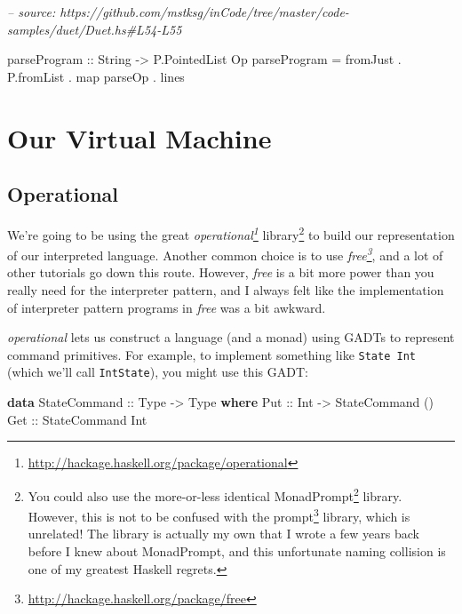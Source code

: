 \documentclass[]{article}
\newenvironment{Shaded}{}{}
\newcommand{\CommentTok}[1]{\textcolor[rgb]{0.38,0.63,0.69}{\textit{#1}}}
\newcommand{\DataTypeTok}[1]{\textcolor[rgb]{0.56,0.13,0.00}{#1}}
\newcommand{\FunctionTok}[1]{\textcolor[rgb]{0.02,0.16,0.49}{#1}}
\newcommand{\KeywordTok}[1]{\textcolor[rgb]{0.00,0.44,0.13}{\textbf{#1}}}
\newcommand{\NormalTok}[1]{#1}
\newcommand{\OtherTok}[1]{\textcolor[rgb]{0.00,0.44,0.13}{#1}}
\renewcommand{\href}[2]{#2\footnote{\url{#1}}}
\begin{document}
\begin{Shaded}
\begin{Highlighting}[]
\CommentTok{-- source: https://github.com/mstksg/inCode/tree/master/code-samples/duet/Duet.hs#L54-L55}

\OtherTok{parseProgram ::} \DataTypeTok{String} \OtherTok{->} \DataTypeTok{P.PointedList} \DataTypeTok{Op}
\NormalTok{parseProgram }\FunctionTok{=}\NormalTok{ fromJust }\FunctionTok{.}\NormalTok{ P.fromList }\FunctionTok{.}\NormalTok{ map parseOp }\FunctionTok{.}\NormalTok{ lines}
\end{Highlighting}
\end{Shaded}

\hypertarget{our-virtual-machine}{%
\section{Our Virtual Machine}\label{our-virtual-machine}}

\hypertarget{operational}{%
\subsection{Operational}\label{operational}}

We're going to be using the great
\emph{\href{http://hackage.haskell.org/package/operational}{operational}}
library\footnote{You could also use the more-or-less identical
  \href{http://hackage.haskell.org/package/operational}{MonadPrompt} library.
  However, this is not to be confused with the
  \href{http://hackage.haskell.org/package/prompt}{prompt} library, which is
  unrelated! The library is actually my own that I wrote a few years back before
  I knew about MonadPrompt, and this unfortunate naming collision is one of my
  greatest Haskell regrets.} to build our representation of our interpreted
language. Another common choice is to use
\emph{\href{http://hackage.haskell.org/package/free}{free}}, and a lot of other
tutorials go down this route. However, \emph{free} is a bit more power than you
really need for the interpreter pattern, and I always felt like the
implementation of interpreter pattern programs in \emph{free} was a bit awkward.

\emph{operational} lets us construct a language (and a monad) using GADTs to
represent command primitives. For example, to implement something like
\texttt{State\ Int} (which we'll call \texttt{IntState}), you might use this
GADT:

\begin{Shaded}
\begin{Highlighting}[]
\KeywordTok{data} \DataTypeTok{StateCommand}\OtherTok{ ::} \DataTypeTok{Type} \OtherTok{->} \DataTypeTok{Type} \KeywordTok{where}
    \DataTypeTok{Put}\OtherTok{ ::} \DataTypeTok{Int} \OtherTok{->} \DataTypeTok{StateCommand}\NormalTok{ ()}
    \DataTypeTok{Get}\OtherTok{ ::} \DataTypeTok{StateCommand} \DataTypeTok{Int}
\end{Highlighting}
\end{Shaded}
\end{document}
